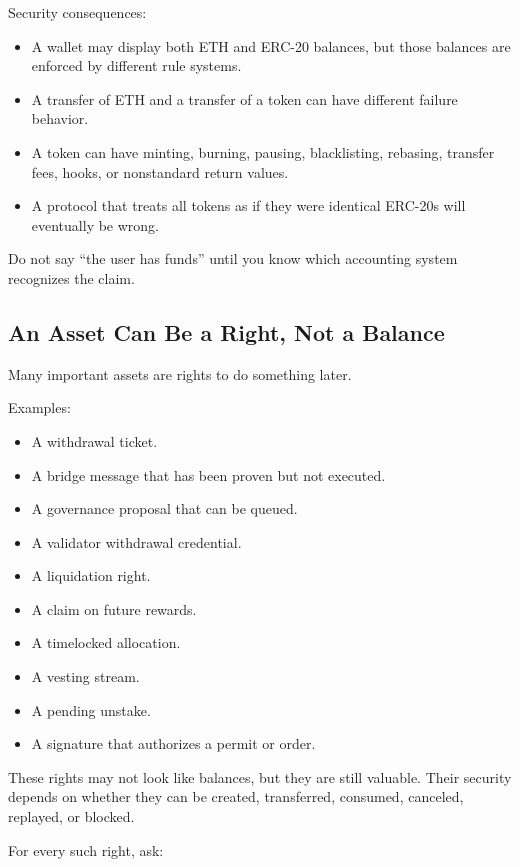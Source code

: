 Security consequences:

\begin{itemize}
\tightlist
\item
  A wallet may display both ETH and ERC-20 balances, but those balances
  are enforced by different rule systems.
\item
  A transfer of ETH and a transfer of a token can have different failure
  behavior.
\item
  A token can have minting, burning, pausing, blacklisting, rebasing,
  transfer fees, hooks, or nonstandard return values.
\item
  A protocol that treats all tokens as if they were identical ERC-20s
  will eventually be wrong.
\end{itemize}

Do not say ``the user has funds'' until you know which accounting system
recognizes the claim.

\subsection{An Asset Can Be a Right, Not a Balance}

Many important assets are rights to do something later.

Examples:

\begin{itemize}
\tightlist
\item
  A withdrawal ticket.
\item
  A bridge message that has been proven but not executed.
\item
  A governance proposal that can be queued.
\item
  A validator withdrawal credential.
\item
  A liquidation right.
\item
  A claim on future rewards.
\item
  A timelocked allocation.
\item
  A vesting stream.
\item
  A pending unstake.
\item
  A signature that authorizes a permit or order.
\end{itemize}

These rights may not look like balances, but they are still valuable.
Their security depends on whether they can be created, transferred,
consumed, canceled, replayed, or blocked.

For every such right, ask:

